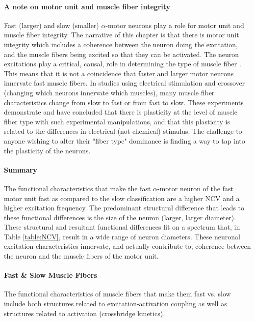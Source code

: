 \paragraph{A note on motor unit and muscle fiber integrity}
Fast (larger) and slow (smaller) $\alpha$-motor neurons play a role for motor unit and muscle fiber integrity. The narrative of this chapter is that there is motor unit integrity which includes a coherence between the neuron doing the excitation, and the muscle fibers being excited so that they can be activated. The neuron excitations play a critical, causal, role in determining the type of muscle fiber \cite{buchthal_motor_1980}. This means that it is not a coincidence that faster and larger motor neurons innervate fast muscle fibers. In studies using electrical stimulation and crossover (changing which neurons innervate which muscles), many muscle fiber characteristics change from slow to fast or from fast to slow. These experiments demonstrate and have concluded that there is plasticity at the level of muscle fiber type with such experimental manipulations, and that this plasticity is related to the differences in electrical (not chemical) stimulus. The challenge to anyone wishing to alter their "fiber type" dominance is finding a way to  tap into the plasticity of the neurons.

\paragraph{Summary}
The functional characteristics that make the fast $\alpha$-motor neuron of the fast motor unit fast as compared to the slow classification are a higher NCV and a higher excitation frequency. The predominant structural difference that leads to these functional differences is the size of the neuron (larger, larger diameter). These structural and resultant functional differences fit on a spectrum that, in Table \ref{table:NCV}, result in a wide range of neuron diameters. These neuronal excitation characteristics innervate, and actually contribute to, coherence between the neuron and the muscle fibers of the motor unit.


\paragraph{Fast \& Slow Muscle Fibers}

The functional characteristics of muscle fibers that make them fast vs. slow include both structures related to excitation-activation coupling as well as structures related to activation (crossbridge kinetics). 

